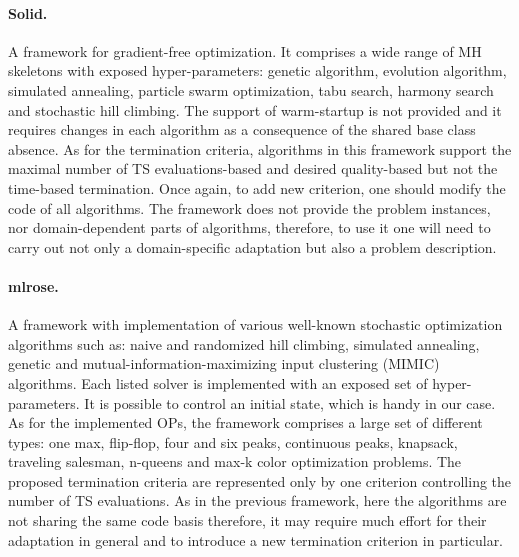 \paragraph{Solid.} A framework for gradient-free optimization. It comprises a wide range of MH skeletons with exposed hyper-parameters: genetic algorithm, evolution algorithm, simulated annealing, particle swarm optimization, tabu search, harmony search and stochastic hill climbing. The support of warm-startup is not provided and it requires changes in each algorithm as a consequence of the shared base class absence. As for the termination criteria, algorithms in this framework support the maximal number of TS evaluations-based and desired quality-based but not the time-based termination. Once again, to add new criterion, one should modify the code of all algorithms. The framework does not provide the problem instances, nor domain-dependent parts of algorithms, therefore, to use it one will need to carry out not only a domain-specific adaptation but also a problem description.

\paragraph{mlrose.} A framework with implementation of various well-known stochastic optimization algorithms such as: naive and randomized hill climbing, simulated annealing, genetic and mutual-information-maximizing input clustering (MIMIC) algorithms. Each listed solver is implemented with an exposed set of hyper-parameters. It is possible to control an initial state, which is handy in our case. As for the implemented OPs, the framework comprises a large set of different types: one max, flip-flop, four and six peaks, continuous peaks, knapsack, traveling salesman, n-queens and max-k color optimization problems. The proposed termination criteria are represented only by one criterion controlling the number of TS evaluations. As in the previous framework, here the algorithms are not sharing the same code basis therefore, it may require much effort for their adaptation in general and to introduce a new termination criterion in particular.


